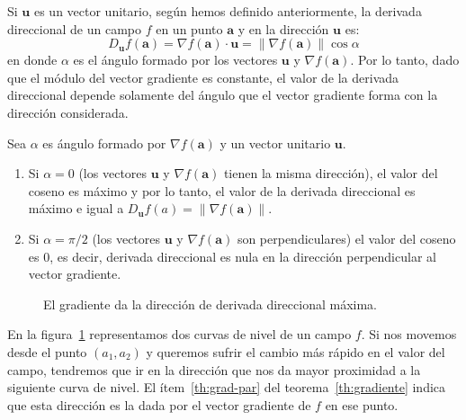 Si $\boldsymbol{u}$ es un vector unitario,
según hemos definido anteriormente, la derivada direccional de un campo $f$ en un punto $\boldsymbol a$ y en la dirección $\boldsymbol u$ es:
\[
D_{\boldsymbol{u}}f(\boldsymbol{a})= \nabla f(\boldsymbol{a})\cdot\boldsymbol{u}
=\|\nabla f(\boldsymbol{a})\|\cos\alpha
\]
en donde $\alpha$ es el ángulo formado por los vectores $\boldsymbol{u}$ y $\nabla f(\boldsymbol{a})$.
Por lo tanto, dado que el módulo del vector gradiente es constante, el valor de la derivada direccional depende solamente del ángulo que el vector gradiente forma con la dirección considerada.
%
\begin{teorema}\label{th:gradiente}
Sea $\alpha$ es ángulo formado por $\nabla f(\boldsymbol a)$ y un vector unitario $\boldsymbol u$.
\begin{enumerate}
\item\label{th:grad-par}
Si $\alpha=0$ (los vectores $\boldsymbol u$ y $\nabla f(\boldsymbol a)$ tienen la misma dirección), el valor del coseno es máximo y por lo tanto, el valor de la derivada direccional es máximo e igual a
$D_{\boldsymbol u}f(a)=\|\nabla f(\boldsymbol{a})\|$.
\item\label{th:grad-perp}
Si $\alpha=\pi/2$ (los vectores $\boldsymbol u$ y $\nabla f(\boldsymbol a)$ son perpendiculares) el valor del coseno es 0, es decir, derivada direccional es nula en la dirección perpendicular al vector gradiente.
\end{enumerate}
\end{teorema}
%
\begin{figure}
\begin{center}
\end{center}
\caption{El gradiente da la dirección de derivada direccional máxima.}\label{fig:grad-max}
\end{figure}
%
En la figura~\ref{fig:grad-max} representamos dos curvas de nivel de un campo $f$. Si nos movemos desde el punto $(a_1,a_2)$ y queremos sufrir el cambio más rápido en el valor del campo, tendremos que ir en la dirección que nos da mayor proximidad a la siguiente curva de nivel.
El ítem~\ref{th:grad-par} del teorema~\ref{th:gradiente} indica que esta dirección es la dada por el vector gradiente de $f$ en ese punto.

